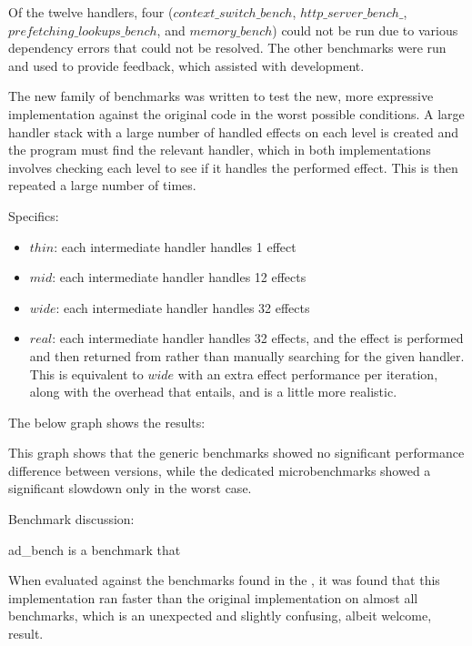 \documentclass[logo,bsc,singlespacing,parskip,online]{infthesis}
\begin{document}
Of the twelve handlers, four ($context\_switch\_bench$, $http\_server\_bench\_$, $prefetching\_lookups\_bench$, and $memory\_bench$) could not be run due to various dependency errors that could not be resolved.  The other benchmarks were run and used to provide feedback, which assisted with development. 

The new family of benchmarks was written to test the new, more expressive implementation against the original code in the worst possible conditions. A large handler stack with a large number of handled effects on each level is created and the program must find the relevant handler, which in both implementations involves checking each level to see if it handles the performed effect. This is then repeated a large number of times.

Specifics: 

\begin{itemize}
    \item $thin$: each intermediate handler handles 1 effect
    \item $mid$: each intermediate handler handles 12 effects
    \item $wide$: each intermediate handler handles 32 effects
    \item $real$: each intermediate handler handles 32 effects, and the effect is performed and then returned from rather than manually searching for the given handler. This is equivalent to $wide$ with an extra effect performance per iteration, along with the overhead that entails, and is a little more realistic.
\end{itemize}

The below graph shows the results:


This graph shows that the generic benchmarks showed no significant performance difference between versions, while the dedicated microbenchmarks showed a significant slowdown only in the worst case.


Benchmark discussion:

ad\_bench is a benchmark that 




When evaluated against the benchmarks found in the , it was found that this implementation ran faster than the original implementation on almost all benchmarks, which is an unexpected and slightly confusing, albeit welcome, result.
\end{document}

